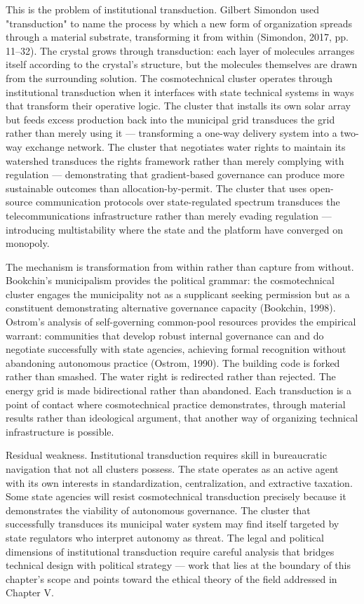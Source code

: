 This is the problem of institutional transduction. Gilbert Simondon used "transduction" to name the process by which a new form of organization spreads through a material substrate, transforming it from within (Simondon, 2017, pp. 11–32). The crystal grows through transduction: each layer of molecules arranges itself according to the crystal's structure, but the molecules themselves are drawn from the surrounding solution. The cosmotechnical cluster operates through institutional transduction when it interfaces with state technical systems in ways that transform their operative logic. The cluster that installs its own solar array but feeds excess production back into the municipal grid transduces the grid rather than merely using it — transforming a one-way delivery system into a two-way exchange network. The cluster that negotiates water rights to maintain its watershed transduces the rights framework rather than merely complying with regulation — demonstrating that gradient-based governance can produce more sustainable outcomes than allocation-by-permit. The cluster that uses open-source communication protocols over state-regulated spectrum transduces the telecommunications infrastructure rather than merely evading regulation — introducing multistability where the state and the platform have converged on monopoly.

The mechanism is transformation from within rather than capture from without. Bookchin's municipalism provides the political grammar: the cosmotechnical cluster engages the municipality not as a supplicant seeking permission but as a constituent demonstrating alternative governance capacity (Bookchin, 1998). Ostrom's analysis of self-governing common-pool resources provides the empirical warrant: communities that develop robust internal governance can and do negotiate successfully with state agencies, achieving formal recognition without abandoning autonomous practice (Ostrom, 1990). The building code is forked rather than smashed. The water right is redirected rather than rejected. The energy grid is made bidirectional rather than abandoned. Each transduction is a point of contact where cosmotechnical practice demonstrates, through material results rather than ideological argument, that another way of organizing technical infrastructure is possible.

Residual weakness. Institutional transduction requires skill in bureaucratic navigation that not all clusters possess. The state operates as an active agent with its own interests in standardization, centralization, and extractive taxation. Some state agencies will resist cosmotechnical transduction precisely because it demonstrates the viability of autonomous governance. The cluster that successfully transduces its municipal water system may find itself targeted by state regulators who interpret autonomy as threat. The legal and political dimensions of institutional transduction require careful analysis that bridges technical design with political strategy — work that lies at the boundary of this chapter's scope and points toward the ethical theory of the field addressed in Chapter V.

